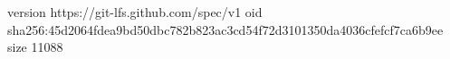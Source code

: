 version https://git-lfs.github.com/spec/v1
oid sha256:45d2064fdea9bd50dbc782b823ac3cd54f72d3101350da4036cfefcf7ca6b9ee
size 11088
